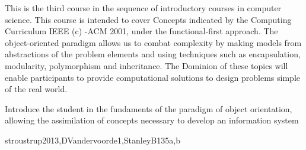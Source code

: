 \begin{syllabus}


\begin{justification}
This is the third course in the sequence of introductory courses in computer science. This course is intended to cover
Concepts indicated by the Computing Curriculum IEEE (c) -ACM 2001, under the functional-first approach.
The object-oriented paradigm allows us to combat complexity by making models from abstractions of the problem elements and using techniques such as encapsulation, modularity, polymorphism and inheritance.
The Dominion  of these topics will enable participants to provide computational solutions to design problems simple of the real world.
\end{justification}

\begin{goals}
\item Introduce the student in the fundaments of the paradigm of object orientation, allowing the assimilation of concepts necessary to develop an information system
\end{goals}



\begin{unit}{\SDFFundamentalProgrammingConcepts}{}{stroustrup2013,DVandervoorde1,StanleyB13}{5}{a,b}
\begin{topics}
	\item \SDFFundamentalProgrammingConceptsTopicBasic
	\item \SDFFundamentalProgrammingConceptsTopicVariables
	\item \SDFFundamentalProgrammingConceptsTopicExpressions
	\item \SDFFundamentalProgrammingConceptsTopicSimple
	\item \SDFFundamentalProgrammingConceptsTopicConditional
	\item \SDFFundamentalProgrammingConceptsTopicFunctions
	\item \SDFFundamentalProgrammingConceptsTopicThe
\end{topics}


\end{unit}
\end{syllabus}
